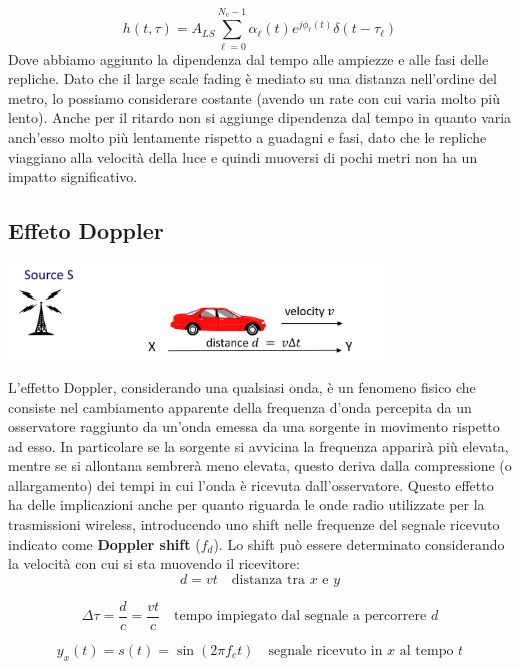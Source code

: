\[
    h(t, \tau) = A_{LS} \sum_{\ell=0}^{N_c-1} \alpha_{\ell}(t) e^{j\phi_{\ell}(t)} \delta(t - \tau_{\ell})
\]
Dove abbiamo aggiunto la dipendenza dal tempo alle ampiezze e alle fasi delle repliche. Dato che il large scale fading è mediato su una distanza nell'ordine del metro, lo possiamo considerare costante (avendo un rate con cui varia molto più lento).
Anche per il ritardo non si aggiunge dipendenza dal tempo in quanto varia anch'esso molto più lentamente rispetto a guadagni e fasi, dato che le repliche viaggiano alla velocità della luce e quindi muoversi di pochi metri non ha un impatto significativo.






\subsection*{Effeto Doppler}
\begin{center}
    \includegraphics[width=0.75\textwidth]{imgs/doppler.png}
\end{center}
    
L'effetto Doppler, considerando una qualsiasi onda, è un fenomeno fisico che consiste nel cambiamento apparente della frequenza d'onda percepita da un osservatore raggiunto da un'onda emessa da una sorgente in movimento rispetto ad esso.
In particolare se la sorgente si avvicina la frequenza apparirà più elevata, mentre se si allontana sembrerà meno elevata, questo deriva dalla compressione (o allargamento) dei tempi in cui l'onda è ricevuta dall'osservatore.
Questo effetto ha delle implicazioni anche per quanto riguarda le onde radio utilizzate per la trasmissioni wireless, introducendo uno shift nelle frequenze del segnale ricevuto indicato come \textbf{Doppler shift} ($f_d$).
Lo shift può essere determinato considerando la velocità con cui si sta muovendo il ricevitore:
\[
    d = vt \quad \text{distanza tra $x$ e $y$}
\]

\[
    \Delta \tau = \frac{d}{c} = \frac{vt}{c} \quad \text{tempo impiegato dal segnale a percorrere $d$}
\]

\[
    y_x(t) = s(t) = \sin(2\pi f_c t) \quad \text{segnale ricevuto in $x$ al tempo $t$}
\]

